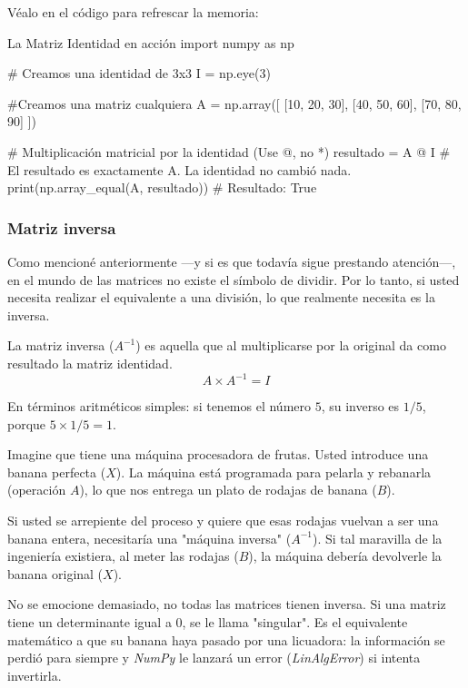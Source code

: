 Véalo en el código para refrescar la memoria:

\begin{pycode}{La Matriz Identidad en acción}
import numpy as np

# Creamos una identidad de 3x3
I = np.eye(3)

#Creamos una matriz cualquiera
A = np.array([
[10, 20, 30],
[40, 50, 60],
[70, 80, 90]
])

# Multiplicación matricial por la identidad (Use @, no *)
resultado = A @ I
# El resultado es exactamente A. La identidad no cambió nada.
print(np.array_equal(A, resultado)) # Resultado: True
\end{pycode}


\subsubsection{Matriz inversa}

Como mencioné anteriormente —y si es que todavía sigue prestando atención—, en el mundo de las matrices no existe el símbolo de dividir. Por lo tanto, si usted necesita realizar el equivalente a una división, lo que realmente necesita es la inversa.

La matriz inversa (\(A^{-1}\)) es aquella que al multiplicarse por la original da como resultado la matriz identidad.
\[
A \times A^{-1} = I
\]

En términos aritméticos simples: si tenemos el número \(5\), su inverso es \(1/5\), porque \(5 \times 1/5 = 1\).

\begin{ejemplo}
    Imagine que tiene una máquina procesadora de frutas. Usted introduce una banana perfecta (\(X\)). La máquina está programada para pelarla y rebanarla (operación \(A\)), lo que nos entrega un plato de rodajas de banana (\(B\)).

    Si usted se arrepiente del proceso y quiere que esas rodajas vuelvan a ser una banana entera, necesitaría una "máquina inversa" ($A^{-1}$). Si tal maravilla de la ingeniería existiera, al meter las rodajas ($B$), la máquina debería devolverle la banana original ($X$).
\end{ejemplo}

No se emocione demasiado, no todas las matrices tienen inversa. Si una matriz tiene un determinante igual a 0, se le llama "singular". Es el equivalente matemático a que su banana haya pasado por una licuadora: la información se perdió para siempre y \textit{NumPy} le lanzará un error (\textit{LinAlgError}) si intenta invertirla.

